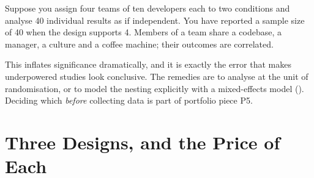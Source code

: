 \begin{alertbox}
Suppose you assign four teams of ten developers each to two conditions and
analyse 40 individual results as if independent. You have reported a sample
size of 40 when the design supports 4. Members of a team share a codebase, a
manager, a culture and a coffee machine; their outcomes are correlated.

\medskip
This inflates significance dramatically, and it is exactly the error that makes
underpowered studies look conclusive. The remedies are to analyse at the unit
of randomisation, or to model the nesting explicitly with a mixed-effects model
(). Deciding which \emph{before} collecting data is part of
portfolio piece P5.
\end{alertbox}

\section{Three Designs, and the Price of Each}

